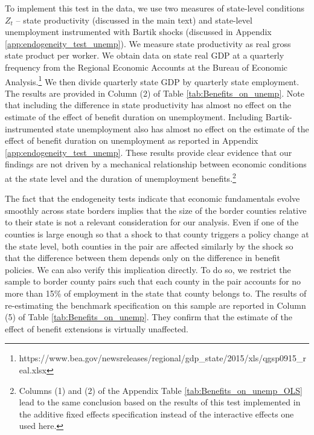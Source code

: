 \documentclass[12pt]{article}
\newcommand{\1}{\mathbf{1}}
\begin{document}
To implement this test in the data, we use two measures of state-level conditions $Z_t$ -- state productivity (discussed in the main text) and state-level unemployment instrumented with Bartik shocks (discussed in Appendix \ref{app:endogeneity_test_unemp}). We measure state productivity as real gross state product per worker.  We obtain data on state real GDP at a quarterly frequency from the Regional Economic Accounts at the Bureau of Economic Analysis.\footnote{https://www.bea.gov/newsreleases/regional/gdp\_state/2015/xls/qgsp0915\_real.xlsx} We then divide quarterly state GDP by quarterly state employment. The results are provided in Column (2) of Table \ref{tab:Benefits_on_unemp}. Note that including the difference in state productivity has almost no effect on the estimate of the effect of benefit duration on unemployment. Including Bartik-instrumented state unemployment also has almost no effect on the estimate of the effect of benefit duration on unemployment as reported in Appendix \ref{app:endogeneity_test_unemp}. These results provide clear evidence that our findings are not driven by a mechanical relationship between economic conditions at the state level and the duration of unemployment benefits.\footnote{Columns (1) and (2) of the Appendix Table \ref{tab:Benefits_on_unemp_OLS} lead to the same conclusion based on the results of this test implemented in the additive fixed effects specification instead of the interactive effects one used here.}

The fact that the endogeneity tests indicate that economic fundamentals evolve smoothly across state borders implies that the size of the border counties relative to their state is not a relevant consideration for our analysis. Even if one of the counties is large enough so that a shock to that county triggers a policy change at the state level, both counties in the pair are affected similarly by the shock so that the difference between them depends only on the difference in benefit policies. We can also verify this implication directly. To do so, we restrict the sample to border county pairs such that each county in the pair accounts for no more than 15\% of employment in the state that county belongs to. The results of re-estimating the benchmark specification on this sample are reported in Column (5) of Table  \ref{tab:Benefits_on_unemp}. They confirm that the estimate of the effect of benefit extensions is virtually unaffected.



\end{document}

